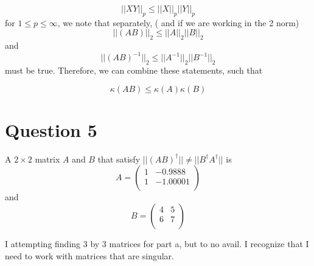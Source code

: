\documentclass[a4paper,12pt]{article}
\begin{document}
 \begin{equation}
 ||XY||_p \leq ||X||_p ||Y||_p
 \end{equation} for $1\leq p \leq \infty$, we note that separately, ( and if we are working in the 2 norm)
 \begin{equation}
 ||(AB)||_2 \leq ||A||_2 ||B||_2
 \end{equation} and 
 \begin{equation}
 || (AB)^{-1} ||_2 \leq||A^{-1}||_2 ||B^{-1}||_2
 \end{equation} must be true. Therefore, we can combine these statements, such that
 
 \begin{equation}
 \kappa(AB) \leq \kappa(A) \kappa(B)
 \end{equation}
 
 
  \section{Question 5}
A $2\times 2$ matrix $A$ and $B$ that satisfy $ ||(AB)^{\dagger}|| \neq || B^{\dagger} A^{\dagger}|| $ is
\begin{equation}
A= \begin{pmatrix}
1 & -0.9888 \\
1 & -1.00001\\
\end{pmatrix}
\end{equation} and
\begin{equation}
B=\begin{pmatrix}
4&5\\
6&7\\
\end{pmatrix}
\end{equation}

I attempting finding 3 by 3 matrices for part a, but to no avail. I recognize that I need to work with matrices that are singular.
 
\end{document}
